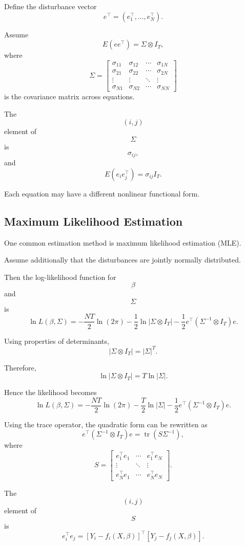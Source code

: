 Define the disturbance vector
\[
e^\top
=
(e_1^\top,\dots,e_N^\top).
\]

Assume
\[
E(ee^\top)
=
\Sigma\otimes I_T,
\]
where
\[
\Sigma
=
\begin{bmatrix}
\sigma_{11} & \sigma_{12} & \cdots & \sigma_{1N}\\
\sigma_{21} & \sigma_{22} & \cdots & \sigma_{2N}\\
\vdots & \vdots & \ddots & \vdots\\
\sigma_{N1} & \sigma_{N2} & \cdots & \sigma_{NN}
\end{bmatrix}
\]
is the covariance matrix across equations.

The
\[
(i,j)
\]
element of
\[
\Sigma
\]
is
\[
\sigma_{ij},
\]
and
\[
E(e_ie_j^\top)=\sigma_{ij}I_T.
\]

Each equation may have a different nonlinear functional form.

\subsection{Maximum Likelihood Estimation}

One common estimation method is maximum likelihood estimation (MLE).

Assume additionally that the disturbances are jointly normally distributed.

Then the log-likelihood function for
\[
\beta
\]
and
\[
\Sigma
\]
is
\[
\ln L(\beta,\Sigma)
=
-\frac{NT}{2}\ln(2\pi)
-
\frac12\ln|\Sigma\otimes I_T|
-
\frac12
e^\top
(\Sigma^{-1}\otimes I_T)
e.
\]

Using properties of determinants,
\[
|\Sigma\otimes I_T|
=
|\Sigma|^T.
\]

Therefore,
\[
\ln|\Sigma\otimes I_T|
=
T\ln|\Sigma|.
\]

Hence the likelihood becomes
\[
\ln L(\beta,\Sigma)
=
-\frac{NT}{2}\ln(2\pi)
-
\frac{T}{2}\ln|\Sigma|
-
\frac12
e^\top
(\Sigma^{-1}\otimes I_T)
e.
\]

Using the trace operator,
the quadratic form can be rewritten as
\[
e^\top
(\Sigma^{-1}\otimes I_T)
e
=
\operatorname{tr}(S\Sigma^{-1}),
\]
where
\[
S
=
\begin{bmatrix}
e_1^\top e_1 & \cdots & e_1^\top e_N\\
\vdots & \ddots & \vdots\\
e_N^\top e_1 & \cdots & e_N^\top e_N
\end{bmatrix}.
\]

The
\[
(i,j)
\]
element of
\[
S
\]
is
\[
e_i^\top e_j
=
[Y_i-f_i(X,\beta)]^\top
[Y_j-f_j(X,\beta)].
\]

